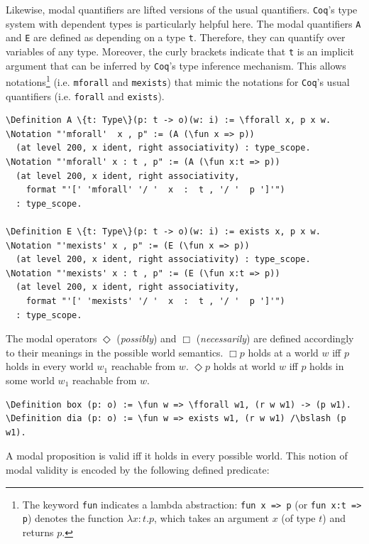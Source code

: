 \documentclass{llncs}
\newcommand{\nec}{\Box} %
\newcommand{\pos}{\Diamond} %
\newcommand{\red}[1]{\textcolor[rgb]{1,0,0}{#1}}
\newcommand{\blue}[1]{\textcolor[rgb]{0,0,1}{#1}}
\newcommand{\Definition}{\red{Definition}}
\newcommand{\Notation}{\blue{Notation}}
\newcommand{\fforall}{\blue{forall}}
\newcommand{\fun}{\blue{fun}}
\newcommand{\bslash}{\symbol{92}}
\newcommand{\Coq}{\texttt{Coq}\xspace}
\begin{document}
\noindent 
Likewise, modal quantifiers are lifted versions of the usual
quantifiers. \Coq's type system with dependent types is particularly
helpful here. The modal quantifiers \texttt{A} and \texttt{E} are
defined as depending on a type \texttt{t}. Therefore, they can
quantify over variables of any type. Moreover, the curly brackets
indicate that \texttt{t} is an implicit argument that can be inferred
by \Coq's type inference mechanism. This allows notations\footnote{The
keyword \texttt{\fun} indicates a lambda abstraction: \texttt{\fun \ x
=> p} (or \texttt{\fun \ x:t => p}) denotes the function 
$\lambda x:t.p$, which takes an argument $x$ (of type $t$) and returns $p$.}
(i.e. \texttt{mforall} and \texttt{mexists}) that mimic the notations
for \Coq's usual quantifiers (i.e. \texttt{forall} and
\texttt{exists}).

\begin{Verbatim}[commandchars=\\\{\},fontsize=\verbsize]
\Definition A \{t: Type\}(p: t -> o)(w: i) := \fforall x, p x w.
\Notation "'mforall'  x , p" := (A (\fun x => p))
  (at level 200, x ident, right associativity) : type_scope.
\Notation "'mforall' x : t , p" := (A (\fun x:t => p))
  (at level 200, x ident, right associativity, 
    format "'[' 'mforall' '/ '  x  :  t , '/ '  p ']'")
  : type_scope.

\Definition E \{t: Type\}(p: t -> o)(w: i) := exists x, p x w.
\Notation "'mexists' x , p" := (E (\fun x => p))
  (at level 200, x ident, right associativity) : type_scope.
\Notation "'mexists' x : t , p" := (E (\fun x:t => p))
  (at level 200, x ident, right associativity, 
    format "'[' 'mexists' '/ '  x  :  t , '/ '  p ']'")
  : type_scope.
\end{Verbatim}

\noindent 
The modal operators $\Diamond$ (\emph{possibly}) and $\Box$
(\emph{necessarily}) are defined accordingly to their meanings in the
possible world semantics. $\nec p$ holds at a world $w$ iff $p$ holds
in every world $w_1$ reachable from $w$. $\pos p$ holds at world $w$
iff $p$ holds in some world $w_1$ reachable from $w$.

\begin{Verbatim}[commandchars=\\\{\},fontsize=\verbsize]
\Definition box (p: o) := \fun w => \fforall w1, (r w w1) -> (p w1).
\Definition dia (p: o) := \fun w => exists w1, (r w w1) /\bslash (p w1).
\end{Verbatim}


\noindent
A modal proposition is valid iff it holds in every possible world. 
This notion of modal validity is encoded by the following defined predicate:
\end{document}
